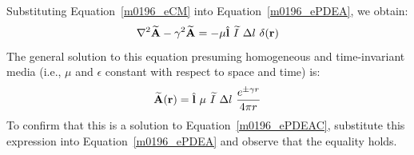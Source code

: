 Substituting Equation~\ref{m0196_eCM} into Equation~\ref{m0196_ePDEA}, we obtain: 
%
\begin{equation}
\nabla^2 \widetilde{\bf A}
-\gamma^2\widetilde{\bf A} 
= 
-\mu\hat{\bf l}~\widetilde{I}~\Delta l~\delta({\bf r}) 
\label{m0196_ePDEAC}
\end{equation}
%
The general solution to this equation presuming homogeneous and time-invariant media (i.e., $\mu$ and $\epsilon$ constant with respect to space and time) is:
%
\begin{equation}
\widetilde{\bf A}({\bf r}) = \hat{\bf l}~\mu~\widetilde{I}~\Delta l~\frac{e^{\pm \gamma r}}{4\pi r}
\label{m0196_eA}
\end{equation}
% 
To confirm that this is a solution to Equation~\ref{m0196_ePDEAC}, substitute this expression into Equation~\ref{m0196_ePDEA} and observe that the equality holds.

